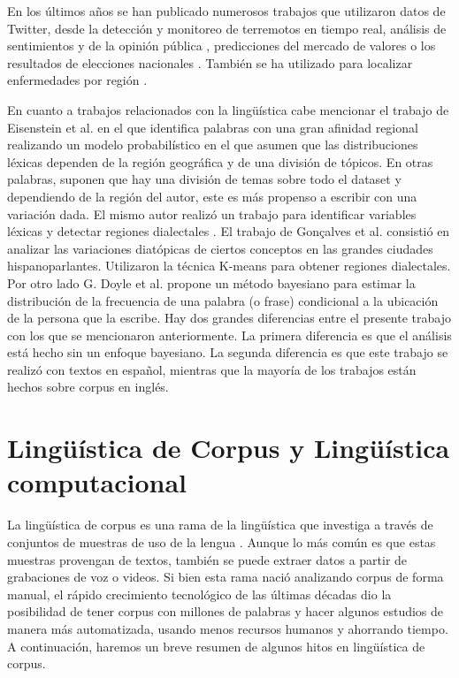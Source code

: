 En los últimos años se han publicado numerosos trabajos que utilizaron datos de Twitter, desde la detección y monitoreo de terremotos en tiempo real\cite{sakaki2010earthquake}, análisis de sentimientos y de la opinión pública \cite{liu2012sentiment},  predicciones del mercado de valores \cite{pak2010twitter} o los resultados de elecciones nacionales \cite{tumasjan2010predicting}. También se ha utilizado para localizar enfermedades por región \cite{paul2011you}.

En cuanto a trabajos relacionados con la lingüística cabe mencionar el trabajo de Eisenstein et al. \cite{eisenstein2010latent} en el que identifica palabras con una gran afinidad regional realizando un modelo probabilístico en el que asumen que las distribuciones léxicas dependen de la región geográfica y de una división de tópicos. En otras palabras, suponen que hay una división de temas sobre todo el dataset y dependiendo de la región del autor, este es más propenso a escribir con una variación dada. El mismo autor realizó un trabajo para identificar variables léxicas y detectar regiones dialectales \cite{eisenstein2014identifying}.
El trabajo de Gonçalves et al. \cite{gonccalves2014crowdsourcing} consistió en analizar las variaciones diatópicas de ciertos conceptos en las grandes ciudades hispanoparlantes. Utilizaron la técnica K-means \cite{bishop2006pattern} para obtener regiones dialectales. Por otro lado G. Doyle et al. \cite{doyle2014mapping} propone un método bayesiano para estimar la distribución de la frecuencia de una palabra (o frase) condicional a la ubicación de la persona que la escribe.
Hay dos grandes diferencias entre el presente trabajo con los que se mencionaron anteriormente. La primera diferencia es que el análisis está hecho sin un enfoque bayesiano. La segunda diferencia es que este trabajo se realizó con textos en español, mientras que la mayoría de los trabajos están hechos sobre corpus en inglés. 


\section{Lingüística de Corpus y Lingüística computacional} %
\label{linguistica_computacional}

La lingüística de corpus es una rama de la lingüística que investiga a través de conjuntos de muestras de uso de la lengua \cite{mcenery2011corpus}. Aunque lo más común es que estas muestras provengan de textos, también se puede extraer datos a partir de grabaciones de voz o videos. Si bien esta rama nació analizando corpus de forma manual, el rápido crecimiento
tecnológico de las últimas décadas dio la posibilidad de tener corpus con millones de palabras y hacer algunos estudios de manera más automatizada, usando menos recursos humanos y ahorrando tiempo. A continuación, haremos un breve resumen de algunos hitos en lingüística de corpus.

